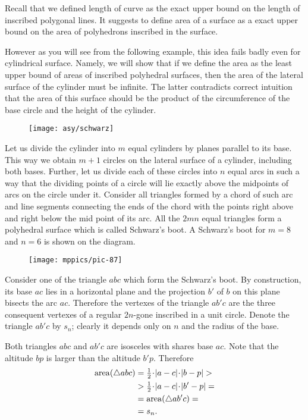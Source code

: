 Recall that we defined length of curve as the exact upper bound on the length of inscribed polygonal lines.
It suggests to define area of a surface as a exact upper bound on the area of polyhedrons inscribed in the surface.

However as you will see from the following example, this idea fails badly even for cylindrical surface.
Namely, we will show that if we define the area as the least upper bound of areas of inscribed polyhedral surfaces, 
then the area of the lateral surface of the cylinder must be infinite.
The latter contradicts correct intuition that the area of this surface should be the product of the circumference of the base circle and the height of the cylinder.


\begin{wrapfigure}{r}{42 mm}
\centering
\texttt{[image: asy/schwarz]}
\end{wrapfigure}

Let us divide the cylinder into $m$ equal cylinders by planes parallel to its base.
This way we obtain $m+1$ circles on the lateral surface of a cylinder, including both bases.
Further, let us divide each of these circles into $n$ equal arcs in such a way that the dividing points 
of a circle will lie exactly above the midpoints of arcs on the circle under it.
Consider all triangles formed by a chord of such arc and line segments connecting the ends of the chord with the points right above and right below the mid point of its arc.
All the $2mn$ equal triangles form a polyhedral surface which is called Schwarz's boot.
A Schwarz's boot for $m=8$ and $n=6$ is shown on the diagram.

{

\begin{wrapfigure}{o}{40 mm}
\centering
\texttt{[image: mppics/pic-87]}
\end{wrapfigure}

Consider one of the triangle $abc$ which form the Schwarz's boot.
By construction, its base $ac$ lies in a horizontal plane and the projection $b'$ of $b$ on this plane bisects the arc $ac$.
Therefore the vertexes of the triangle $ab'c$ are the three consequent vertexes of a regular $2n$-gone inscribed in a unit circle.
Denote the triangle $ab'c$ by $s_n$; clearly it depends only on $n$ and the radius of the base.


Both triangles $abc$ and $ab'c$ are isosceles with shares base $ac$.
Note that the altitude $bp$ is larger than the altitude $b'p$.
Therefore
\begin{align*}
\area (\triangle abc)&=\tfrac12\cdot |a-c|\cdot |b-p|>
\\
&>\tfrac12\cdot |a-c|\cdot |b'-p|=
\\
&=\area (\triangle ab'c)=
\\
&=s_n.
\end{align*}

}

